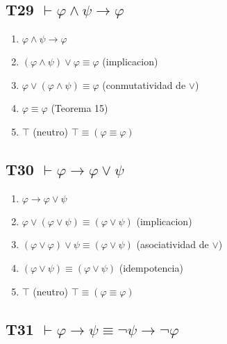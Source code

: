 \subsection{T29 $\vdash \varphi \land \psi \rightarrow \varphi$}

\begin{enumerate}
    \item $\varphi \land \psi \rightarrow \varphi$
    \item $(\varphi \land \psi) \lor \varphi \equiv \varphi$ \hfill (implicacion)
    \item $\varphi \lor (\varphi \land \psi) \equiv \varphi$ \hfill (conmutatividad de $\lor$)
    \item $\varphi \equiv \varphi$ \hfill (Teorema 15)
    \item $\top$ \hfill (neutro) $\top \equiv (\varphi \equiv \varphi)$
\end{enumerate}

\subsection{T30 $\vdash \varphi \rightarrow \varphi \lor \psi$}

\begin{enumerate}
    \item $\varphi \rightarrow \varphi \lor \psi$
    \item $\varphi \lor (\varphi \lor \psi) \equiv (\varphi \lor \psi)$ \hfill (implicacion)
    \item $(\varphi \lor \varphi) \lor \psi \equiv (\varphi \lor \psi)$ \hfill (asociatividad de $\lor$)
    \item $(\varphi \lor \psi) \equiv (\varphi \lor \psi)$ \hfill (idempotencia)
    \item $\top$ \hfill (neutro) $\top \equiv (\varphi \equiv \varphi)$
\end{enumerate}

\subsection{T31 $\vdash \varphi \rightarrow \psi \equiv \neg\psi \rightarrow \neg\varphi$}

